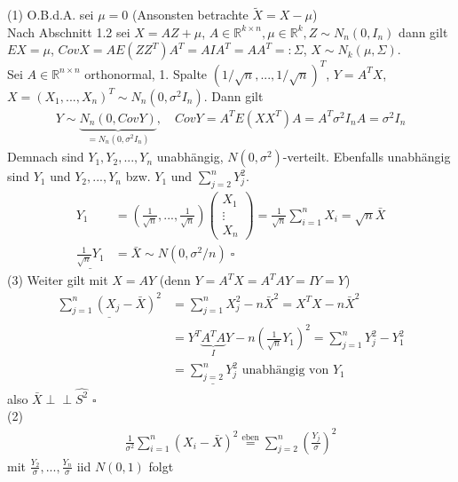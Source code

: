 \documentclass[a4paper,openany]{book}
\theoremstyle{mytheoremstyle}
\theoremstyle{mytheoremstyle2}
\newtheorem*{cbew}{Beweis}
\newenvironment{bew}[1][]{%
  \ifthenelse{\boolean{showbew}}{%
    \begin{cbew}[#1]%
  }{%
    \expandafter\comment%
  }%
}{%
  \ifthenelse{\boolean{showbew}}{%
    \end{cbew}%
  }{%
    \expandafter\endcomment%
  }%
}
\begin{document}
\begin{bew}[]
  (1) O.B.d.A. sei $\mu =0$ (Ansonsten betrachte $\tilde{X}=X-\mu $) \\
  Nach Abschnitt 1.2 sei $X=AZ+\mu $, $A \in \mathbb{R}^{k \times n}, \mu \in \mathbb{R}^k, Z\sim N_n(0, I_n)$ dann gilt \\
  $EX=\mu $, $CovX=AE(ZZ^T)A^T=AIA^T=AA^T=:\Sigma$, $X\sim N_k(\mu ,\Sigma)$. \\
  Sei $A \in \mathbb{R}^{n \times n}$ orthonormal, 1. Spalte $(1/\sqrt{n},...,1/\sqrt{n})^T$, $Y=A^TX$, $X=(X_1,...,X_n)^T\sim N_n(0,\sigma ^2 I_n)$. Dann gilt 
  \begin{align*}
    Y\sim \underbrace{N_n(0,CovY)}_{=N_n(0,\sigma ^2I_n)}, \quad CovY=A^TE(XX^T)A=A^T \sigma ^2I_nA=\sigma ^2I_n
  \end{align*}
  Demnach sind $Y_1,Y_2,...,Y_n $ unabhängig, $N(0,\sigma ^2)$-verteilt. Ebenfalls unabhängig sind $Y_1$ und $Y_2,...,Y_n$   bzw. $Y_1$ und $\sum_{j=2}^{n}{Y_j^2}$.
  \begin{align*}
    Y_1&=\left(\frac{1}{\sqrt{n}},...,\frac{1}{\sqrt{n}}\right)\begin{pmatrix}X_1\\\vdots\\X_n\end{pmatrix}=\frac{1}{\sqrt{n}}\sum_{i=1}^{n}{X_i}=\sqrt{n}\bar{X} \\
  \underline{\frac{1}{\sqrt{n}}Y_1} &= \bar{X}\sim N(0,\sigma ^2/n)\;\square
  \end{align*}
  (3) Weiter gilt mit $X=AY$ (denn $Y=A^TX=A^TAY=IY=Y$)
  \begin{align*}
    \underline{\sum_{j=1}^{n}{(X_j-\bar{X})^2}}&=\sum_{j=1}^{n}{X_j^2-n \bar{X}^2}=X^TX-n \bar{X}^2 \\
                                   &=Y^T \underbrace{A^TA}_{I}Y-n\left(\frac{1}{\sqrt{n}}Y_1\right)^2=\sum_{j=1}^{n}{Y_j^2-Y_1^2} \\
                                   &=\underline{\sum_{j=2}^{n}{Y_j^2}}\text{ unabhängig von $Y_1$}
  \end{align*}
  also $\bar{X} \perp\!\!\!\perp \hat{S^2}$ $\square$  \\
  (2)    \\
  \begin{align*}
    \frac{1}{\sigma ^2}\sum_{i=1}^{n}{(X_i-\bar{X})^2}\overset{\text{eben}}=\sum_{j=2}^{n}{\left( \frac{Y_j}{\sigma } \right)^2}
  \end{align*}
  mit $\frac{Y_2}{\sigma },...,\frac{Y_n}{\sigma }$ iid $N(0,1)$ folgt 

\end{bew}
\end{document}

